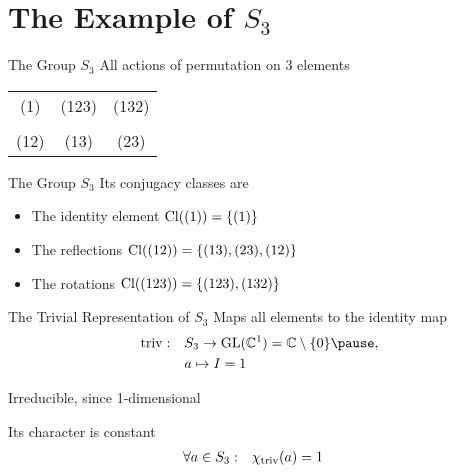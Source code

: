 
\section{The Example of $S_3$}

\begin{frame}{The Group $S_3$}
    \large
    All actions of permutation on $3$ elements

    \pause
    \vspace{2em}
    \centering
    \begin{tabular}{c c c}
        (1)  & (123) & (132) \\\\
        (12) & (13)  & (23)
    \end{tabular}
\end{frame}

%    

\begin{frame}{The Group $S_3$}
    \large
    Its conjugacy classes are

    \pause
    \vspace{1em}
    \begin{itemize}
        \item The identity element \hspace*{\fill} $\operatorname{Cl}((1)) = \{(1)\}$ \pause
        \item The reflections \hspace*{\fill} $\operatorname{Cl}((12)) = \{(13), (23), (12)\}$ \pause
        \item The rotations \hspace*{\fill} $\operatorname{Cl}((123)) = \{(123), (132)\}$
    \end{itemize}
\end{frame}

\begin{frame}{The Trivial Representation of $S_3$}
    \large
    Maps all elements to the identity map
    \pause
    \begin{align*}
        \triv: \quad & S_3 \to \GL(\C^1) = \C \setminus \{0\} \pause , \\
        & a \mapsto I = 1
    \end{align*}

    \pause
    Irreducible, since 1-dimensional

    \pause
    Its character is constant
    \begin{align*}
        \forall a \in S_3: \quad & \chi_{\operatorname{triv}}(a) = 1
    \end{align*}
\end{frame}

